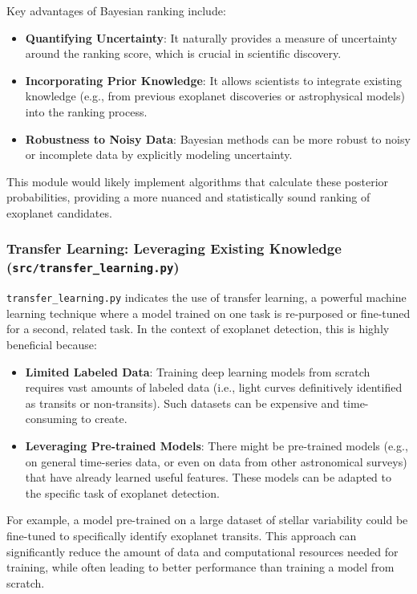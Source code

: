 \documentclass{article}
\begin{document}
Key advantages of Bayesian ranking include:

\begin{itemize}
    \item \textbf{Quantifying Uncertainty}: It naturally provides a measure of uncertainty around the ranking score, which is crucial in scientific discovery.
    \item \textbf{Incorporating Prior Knowledge}: It allows scientists to integrate existing knowledge (e.g., from previous exoplanet discoveries or astrophysical models) into the ranking process.
    \item \textbf{Robustness to Noisy Data}: Bayesian methods can be more robust to noisy or incomplete data by explicitly modeling uncertainty.
\end{itemize}

This module would likely implement algorithms that calculate these posterior probabilities, providing a more nuanced and statistically sound ranking of exoplanet candidates.

\subsubsection{Transfer Learning: Leveraging Existing Knowledge (\texttt{src/transfer\_learning.py})}

\texttt{transfer\_learning.py} indicates the use of transfer learning, a powerful machine learning technique where a model trained on one task is re-purposed or fine-tuned for a second, related task. In the context of exoplanet detection, this is highly beneficial because:

\begin{itemize}
    \item \textbf{Limited Labeled Data}: Training deep learning models from scratch requires vast amounts of labeled data (i.e., light curves definitively identified as transits or non-transits). Such datasets can be expensive and time-consuming to create.
    \item \textbf{Leveraging Pre-trained Models}: There might be pre-trained models (e.g., on general time-series data, or even on data from other astronomical surveys) that have already learned useful features. These models can be adapted to the specific task of exoplanet detection.
\end{itemize}

For example, a model pre-trained on a large dataset of stellar variability could be fine-tuned to specifically identify exoplanet transits. This approach can significantly reduce the amount of data and computational resources needed for training, while often leading to better performance than training a model from scratch.
\end{document}
